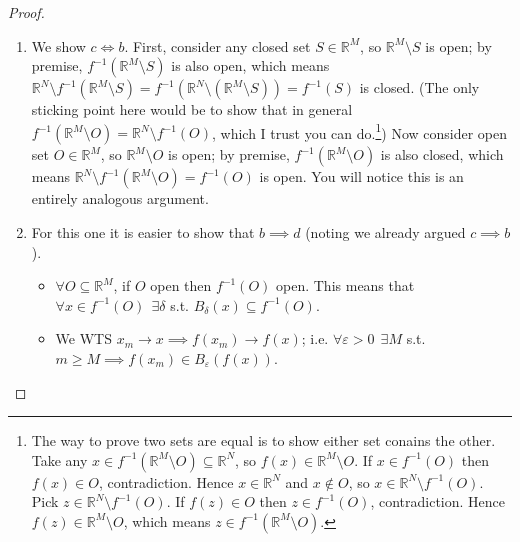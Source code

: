 \documentclass{article}
\begin{document}
\begin{proof}
\begin{enumerate}[1.]
    \item We show $c \iff b$. First, consider any closed set $S \in \mathbb{R}^M$, so $\mathbb{R}^M \setminus S$ is open; by premise, $f^{-1}(\mathbb{R}^M \setminus S)$ is also open, which means $\mathbb{R}^N \setminus f^{-1}(\mathbb{R}^M \setminus S) = f^{-1}(\mathbb{R}^N \setminus (\mathbb{R}^M \setminus S)) = f^{-1}(S)$ is closed. (The only sticking point here would be to show that in general $f^{-1}(\mathbb{R}^M \setminus O) = \mathbb{R}^N \setminus f^{-1}(O)$, which I trust you can do.\footnote{The way to prove two sets are equal is to show either set conains the other. Take any $x \in f^{-1}(\mathbb{R}^M \setminus O) \subseteq \mathbb{R}^N$, so $f(x) \in \mathbb{R}^M \setminus O$. If $x \in f^{-1}(O)$ then $f(x) \in O$, contradiction. Hence $x \in \mathbb{R}^N$ and $x \notin O$, so $x \in \mathbb{R}^N \setminus f^{-1}(O)$.  Pick $z \in \mathbb{R}^N \setminus f^{-1}(O)$. If $f(z) \in O$ then $z \in f^{-1}(O)$, contradiction. Hence $f(z) \in \mathbb{R}^M \setminus O$, which means $z \in f^{-1}(\mathbb{R}^M \setminus O)$.}) Now consider open set $O \in \mathbb{R}^M$, so $\mathbb{R}^M \setminus O$ is open; by premise, $f^{-1}(\mathbb{R}^M \setminus O)$ is also closed, which means $\mathbb{R}^N \setminus f^{-1}(\mathbb{R}^M \setminus O) = f^{-1}(O)$ is open. You will notice this is an entirely analogous argument.


    \item For this one it is easier to show that $b \implies d$ (noting we already argued $c \implies b$).
      \begin{itemize}[label=$\bullet$]
        \item $\forall O \subseteq \mathbb{R}^M$, if $O$ open then $f^{-1}(O)$ open. This means that $\forall x \in f^{-1}(O)~~ \exists\delta$ s.t. $B_{\delta}(x) \subseteq f^{-1}(O)$.

        \item We WTS $x_m \to x \implies f(x_m) \to f(x)$; i.e.  $\forall \varepsilon > 0 ~~ \exists M$ s.t. $m \ge M \implies f(x_m) \in B_{\varepsilon}(f(x))$.

        \begin{figure}[H]
          \centering
\end{figure}
\end{itemize}
\end{enumerate}
\end{proof}
\end{document}
